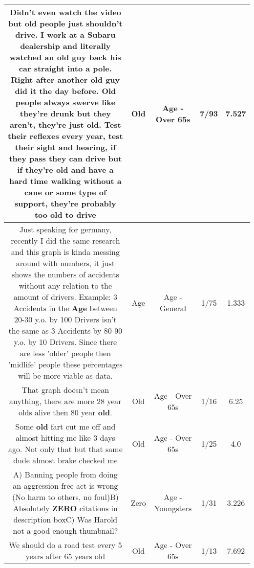 \documentclass[11pt]{article}
\newlength\mylength
\begin{document}
\begin{center}
\begin{longtable}{|C{.65\mylength}|C{.30\mylength}|C{.12\mylength}|C{.12\mylength}|C{.12\mylength}|}
  \small Didn't even watch the video but \textbf{old} people just shouldn't drive. I work at a Subaru dealership and literally watched an \textbf{old} guy back his car straight into a pole. Right after another \textbf{old} guy did it the day before.  \textbf{Old} people always swerve like they're drunk but they aren't, they're just \textbf{old}. Test their reflexes every year, test their sight and hearing, if they pass they can drive but if they're \textbf{old} and have a hard time walking without a cane or some type of support, they're probably too \textbf{old} to drive\normalsize   & Old & Age - Over 65s & 7/93 & 7.527 \\  \hline
  \small Just speaking for germany, recently I did the same research and this graph is kinda messing around with numbers, it just shows the numbers of accidents without any relation to the amount of drivers. Example: 3 Accidents in the \textbf{Age} between 20-30 y.o. by 100 Drivers isn't the same as 3 Accidents by 80-90 y.o. by 10 Drivers. Since there are less 'older' people then 'midlife' people these percentages will be more viable as data.\normalsize   & Age & Age - General & 1/75 & 1.333 \\  \hline
  \small That graph doesn't mean anything, there are more 28 year olds alive then 80 year \textbf{old}.\normalsize   & Old & Age - Over 65s & 1/16 & 6.25 \\  \hline
  \small Some \textbf{old} fart cut me off and almost hitting me like 3 days ago. Not only that but that same dude almost brake checked me\normalsize   & Old & Age - Over 65s & 1/25 & 4.0 \\  \hline
  \small A) Banning people from doing an aggression-free act is wrong (No harm to others, no foul)B) Absolutely \textbf{ZERO} citations in description boxC) Was Harold not a good enough thumbnail?\normalsize   & Zero & Age - Youngsters & 1/31 & 3.226 \\  \hline
  \small We should do a road test every 5 years after 65 years old\normalsize   & Old & Age - Over 65s & 1/13 & 7.692 \\  \hline

\end{longtable}
\end{center}
\end{document}
